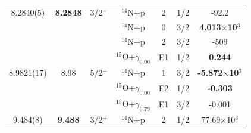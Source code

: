 \begin{table}[]
\begin{center}
\begin{threeparttable}
\begin{tabular}{c  c  c  c  c  c  c}
\hline
8.2840(5)& \textbf{8.2848}&	3/2$^+$	&	$^{14}$N+p	&	2	&	1/2	&	{-92.2}\\
	&	&	&	$^{14}$N+p	&	0	&	3/2	&	\textbf{4.013$\times$10$^3$}\\
	&	&	&	$^{14}$N+p	&	2	&	3/2	&	{-509}\\
	&	&	&	$^{15}$O+$\gamma_{0.00}$	&	E1	&	1/2	&	\textbf{0.244}\\
8.9821(17) & {8.98}&	5/2$^-$	&	$^{14}$N+p	&	1	&	3/2	&	\textbf{-5.872$\times$10$^3$}\\
	&	&	&	$^{15}$O+$\gamma_{0.00}$	&	E2	&	1/2	&	\textbf{-0.303}\\
	&	&	&	$^{15}$O+$\gamma_{6.79}$	&	E1	&	3/2	&	{-0.001}\\
9.484(8) & \textbf{9.488}&	3/2$^+$	&	$^{14}$N+p	&	2	&	1/2	&	{77.69$\times$10$^3$}	\\

\end{tabular}
\end{threeparttable}
\end{center}
\end{table}
